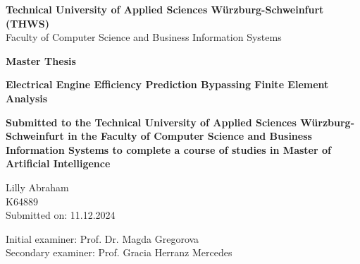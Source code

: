 \documentclass{report} %
\begin{document}
\begin{titlepage}
    \centering
    \vspace*{1cm}
    
    \Large \textbf{Technical University of Applied Sciences Würzburg-Schweinfurt (THWS)}\\
    \vspace{0.5cm}
    \Large Faculty of Computer Science and Business Information Systems\\
    \vspace{1cm}
    
    \huge \textbf{Master Thesis}\\
    \vspace{1.5cm}
    
    \Huge \textbf{Electrical Engine Efficiency Prediction Bypassing Finite Element Analysis}\\
    \vspace{2cm}
    
    \large \textbf{Submitted to the Technical University of Applied Sciences Würzburg-Schweinfurt in the Faculty of Computer Science and Business Information Systems to
    complete a course of studies in Master of Artificial Intelligence}
    
    \vspace{1cm}
    
    \huge Lilly Abraham\\
    \huge K64889\\
    \vspace{1cm}
    \large Submitted on: 11.12.2024\\
    
    \vfill
    
    \large
    Initial examiner: Prof. Dr. Magda Gregorova\\
    Secondary examiner: Prof. Gracia Herranz Mercedes\\

\end{titlepage}

\newpage %
\end{document}

